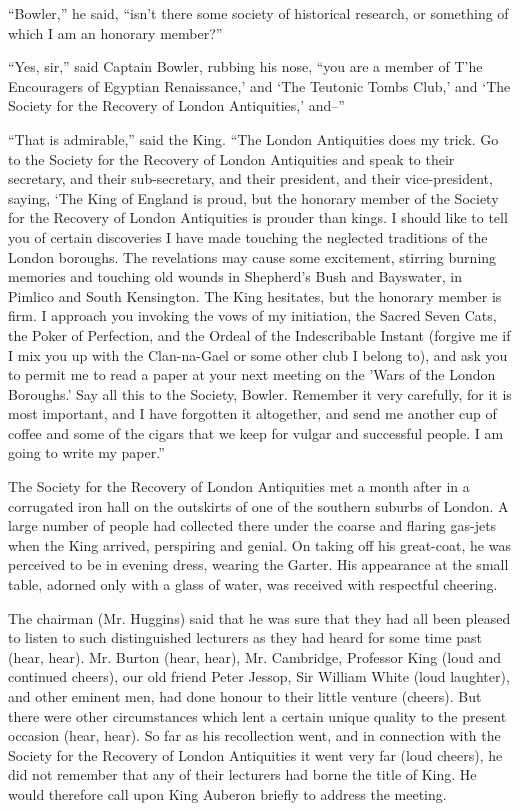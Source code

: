 \documentclass{book}
\begin{document}
“Bowler,” he said, “isn’t there some society of historical research, or something of which I am an honorary member?”

“Yes, sir,” said Captain Bowler, rubbing his nose, “you are a member of T’he Encouragers of Egyptian Renaissance,’ and ‘The Teutonic Tombs Club,’ and ‘The Society for the Recovery of London Antiquities,’ and–”

“That is admirable,” said the King. “The London Antiquities does my trick. Go to the Society for the Recovery of London Antiquities and speak to their secretary, and their sub-secretary, and their president, and their vice-president, saying, ‘The King of England is proud, but the honorary member of the Society for the Recovery of London Antiquities is prouder than kings. I should like to tell you of certain discoveries I have made touching the neglected traditions of the London boroughs. The revelations may cause some excitement, stirring burning memories and touching old wounds in Shepherd’s Bush and Bayswater, in Pimlico and South Kensington. The King hesitates, but the honorary member is firm. I approach you invoking the vows of my initiation, the Sacred Seven Cats, the Poker of Perfection, and the Ordeal of the Indescribable Instant (forgive me if I mix you up with the Clan-na-Gael or some other club I belong to), and ask you to permit me to read a paper at your next meeting on the ’Wars of the London Boroughs.’ Say all this to the Society, Bowler. Remember it very carefully, for it is most important, and I have forgotten it altogether, and send me another cup of coffee and some of the cigars that we keep for vulgar and successful people. I am going to write my paper.”

The Society for the Recovery of London Antiquities met a month after in a corrugated iron hall on the outskirts of one of the southern suburbs of London. A large number of people had collected there under the coarse and flaring gas-jets when the King arrived, perspiring and genial. On taking off his great-coat, he was perceived to be in evening dress, wearing the Garter. His appearance at the small table, adorned only with a glass of water, was received with respectful cheering.

The chairman (Mr. Huggins) said that he was sure that they had all been pleased to listen to such distinguished lecturers as they had heard for some time past (hear, hear). Mr. Burton (hear, hear), Mr. Cambridge, Professor King (loud and continued cheers), our old friend Peter Jessop, Sir William White (loud laughter), and other eminent men, had done honour to their little venture (cheers). But there were other circumstances which lent a certain unique quality to the present occasion (hear, hear). So far as his recollection went, and in connection with the Society for the Recovery of London Antiquities it went very far (loud cheers), he did not remember that any of their lecturers had borne the title of King. He would therefore call upon King Auberon briefly to address the meeting.
\end{document}
